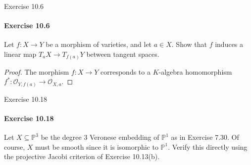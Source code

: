 \documentclass[12pt]{article}
\newenvironment{fullbox}{\begin{lrbox}{\savefullbox}\begin{minipage}{\dimexpr\textwidth-2\fboxsep\relax}}{\end{minipage}\end{lrbox}\begin{center}\framebox[\textwidth]{\usebox{\savefullbox}}\end{center}}
\newenvironment{pbox}[1][]{\begin{fullbox}\ifx#1\empty\else\paragraph{#1}\fi}{\end{fullbox}}
\newcommand{\<}{\langle}
\renewcommand{\>}{\rangle}
\renewcommand{\P}{\mathbb{P}}
\renewcommand{\O}{\mathscr{O}}
\begin{document}
\thispagestyle{title}

\begin{pbox}[Exercise 10.6]
    Let $f : X \to Y$ be a morphism of varieties, and let $a \in X$. Show that $f$ induces a linear map $T_aX \to T_{f(a)}Y$ between tangent spaces.
\end{pbox}

\begin{proof}
    The morphism $f : X \to Y$ corresponds to a $K$-algebra homomorphism $f^* : \O_{Y, f(a)} \to \O_{X, a}$. 
    
\end{proof}

\newpage
\begin{pbox}[Exercise 10.18]
    Let $X \subseteq \P^3$ be the degree $3$ Veronese embedding of $\P^1$ as in Exercise 7.30. Of course, $X$ must be smooth since it is isomorphic to $\P^1$. Verify this directly using the projective Jacobi criterion of Exercise 10.13(b).
\end{pbox}
\end{document}
